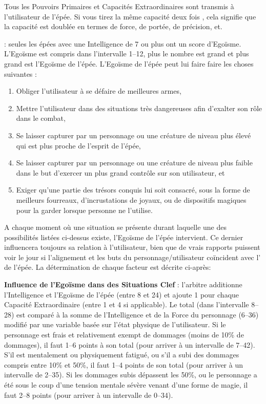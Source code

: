 \documentclass[11pt]{article}
\newcommand{\myunderline}[1]{\underline{\smash{#1}}}
\begin{document}
{{\medskip

Tous les Pouvoirs Primaires et Capacités Extraordinaires sont transmis à l'utilisateur de l'épée. Si vous tirez la même capacité deux fois , cela signifie que la capacité est doublée en termes de force, de portée, de précision, et.

\bigskip

\myunderline{\textbf{Egoïsme}} : seules les épées avec une Intelligence de 7 ou plus ont un score d'Egoïsme. L'Egoïsme est compris dans l'intervalle 1--12, plus le nombre est grand et plus grand est l'Egoïsme de l'épée. L'Egoïsme de l'épée peut lui faire faire les choses suivantes :

\begin{enumerate}
\item Obliger l'utilisateur à se défaire de meilleures armes,
\item Mettre l'utilisateur dans des situations très dangereuses afin d'exalter son rôle dans le combat,
\item Se laisser capturer par un personnage ou une créature de niveau plus élevé qui est plus proche de l'esprit de l'épée,
\item Se laisser capturer par un personnage ou une créature de niveau plus faible dans le but d'exercer un plus grand contrôle sur son utilisateur, et
\item Exiger qu'une partie des trésors conquis lui soit consacré, sous la forme de meilleurs fourreaux, d'incrustations de joyaux, ou de dispositifs magiques pour la garder lorsque personne ne l'utilise.
\end{enumerate}

A chaque moment où une situation se présente durant laquelle une des possibilités listées ci-dessus existe, l'Egoïsme de l'épée intervient. Ce dernier influencera toujours sa relation à l'utilisateur, bien que de vrais rapports puissent voir le jour si l'alignement et les buts du personnage/utilisateur coïncident avec l'\myunderline{origine/objectife} de l'épée. La détermination de chaque facteur est décrite ci-après:

\begin{center}
\begin{minipage}{0.8\linewidth}
\textbf{Influence de l'Egoïsme dans des Situations Clef} : l'arbitre additionne l'Intelligence et l'Egoïsme de l'épée (entre 8 et 24) et ajoute 1 pour chaque Capacité Extraordinaire (entre 1 et 4 si applicable). Le total (dans l'intervalle 8--28) est comparé à la somme de l'Intelligence et de la Force du personnage (6--36) modifié par une variable basée sur l'état physique de l'utilisateur. Si le personnage est frais et relativement exempt de dommages (moins de 10\% de dommages), il faut \myunderline{ajouter} 1--6 points à son total (pour arriver à un intervalle de 7--42). S'il est mentalement ou physiquement fatigué, ou s'il a subi des dommages compris entre 10\% et 50\%, il faut \myunderline{déduire} 1--4 points de son total (pour arriver à un intervalle de 2--35). Si les dommages subis dépassent les 50\%, ou le personnage a été sous le coup d'une tension mentale sévère venant d'une forme de magie, il faut \myunderline{déduire} 2--8 points (pour arriver à un intervalle de 0--34).


\end{minipage}
\end{center}}}
\end{document}
